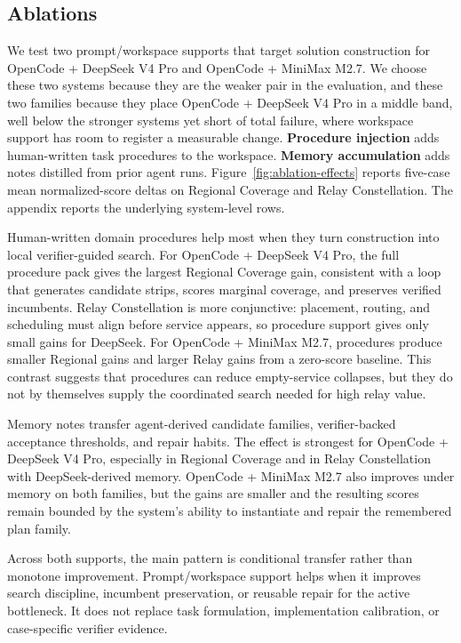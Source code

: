 \documentclass[11pt]{article}
\begin{document}
\subsection{Ablations}
\label{sec:ablations}

We test two prompt/workspace supports that target solution construction for OpenCode + DeepSeek V4 Pro and OpenCode + MiniMax M2.7. We choose these two systems because they are the weaker pair in the evaluation, and these two families because they place OpenCode + DeepSeek V4 Pro in a middle band, well below the stronger systems yet short of total failure, where workspace support has room to register a measurable change. \textbf{Procedure injection} adds human-written task procedures to the workspace. \textbf{Memory accumulation} adds notes distilled from prior agent runs. Figure~\ref{fig:ablation-effects} reports five-case mean normalized-score deltas on Regional Coverage and Relay Constellation. The appendix reports the underlying system-level rows.

Human-written domain procedures help most when they turn construction into local verifier-guided search. For OpenCode + DeepSeek V4 Pro, the full procedure pack gives the largest Regional Coverage gain, consistent with a loop that generates candidate strips, scores marginal coverage, and preserves verified incumbents. Relay Constellation is more conjunctive: placement, routing, and scheduling must align before service appears, so procedure support gives only small gains for DeepSeek. For OpenCode + MiniMax M2.7, procedures produce smaller Regional gains and larger Relay gains from a zero-score baseline. This contrast suggests that procedures can reduce empty-service collapses, but they do not by themselves supply the coordinated search needed for high relay value.

Memory notes transfer agent-derived candidate families, verifier-backed acceptance thresholds, and repair habits. The effect is strongest for OpenCode + DeepSeek V4 Pro, especially in Regional Coverage and in Relay Constellation with DeepSeek-derived memory. OpenCode + MiniMax M2.7 also improves under memory on both families, but the gains are smaller and the resulting scores remain bounded by the system's ability to instantiate and repair the remembered plan family.

Across both supports, the main pattern is conditional transfer rather than monotone improvement. Prompt/workspace support helps when it improves search discipline, incumbent preservation, or reusable repair for the active bottleneck. It does not replace task formulation, implementation calibration, or case-specific verifier evidence.
\end{document}
